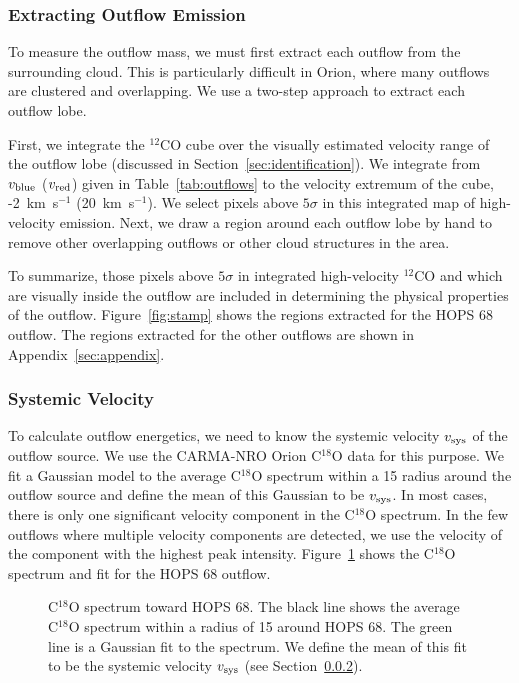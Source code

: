 \documentclass[twocolumn]{aastex63}
\newcommand{\example}{HOPS 68}
\newcommand{\kms}{km~s$^{-1}$}
\begin{document}
\subsubsection{Extracting Outflow Emission}\label{sec:extraction}
To measure the outflow mass, we must first extract each outflow from the surrounding cloud. This is particularly difficult in Orion, where many outflows are clustered and overlapping. We use a two-step approach to extract each outflow lobe.

First, we integrate the $^{12}$CO cube over the visually estimated velocity range of the outflow lobe (discussed in Section~\ref{sec:identification}). We integrate from $v_{\rm blue}$ ($v_{\rm red}$) given in Table~\ref{tab:outflows} to the velocity extremum of the cube, -2~\kms{} (20~\kms{}). We select pixels above $5\sigma$ in this integrated map of high-velocity emission. Next, we draw a region around each outflow lobe by hand to remove other overlapping outflows or other cloud structures in the area. %

To summarize, those pixels above $5\sigma$ in integrated high-velocity $^{12}$CO and which are visually inside the outflow are included in determining the physical properties of the outflow. Figure~\ref{fig:stamp} shows the regions extracted for the \example{} outflow. The regions extracted for the other outflows are shown in Appendix~\ref{sec:appendix}. 

\subsubsection{Systemic Velocity}\label{sec:vsys}
To calculate outflow energetics, we need to know the systemic velocity $v_{\rm sys}$ of the outflow source. We use the CARMA-NRO Orion C$^{18}$O data \citep{Kong18} for this purpose. We fit a Gaussian model to the average C$^{18}$O spectrum within a 15\arcsec{} radius around the outflow source and define the mean of this Gaussian to be $v_{\rm sys}$. In most cases, there is only one significant velocity component in the C$^{18}$O spectrum. In the few outflows where multiple velocity components are detected, we use the velocity of the component with the highest peak intensity. Figure~\ref{fig:c18o_fit} shows the C$^{18}$O spectrum and fit for the \example{} outflow.

\begin{figure}
\caption{C$^{18}$O spectrum toward \example{}. The black line shows the average C$^{18}$O spectrum within a radius of 15\arcsec{} around \example{}. The green line is a Gaussian fit to the spectrum. We define the mean of this fit to be the systemic velocity $v_{\rm sys}$ (see Section~\ref{sec:vsys}). \label{fig:c18o_fit}}
\end{figure}
\end{document}
